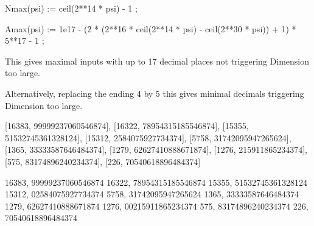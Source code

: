 


\xintdeffunc Nmax(psi) := ceil(2**14 * psi) - 1 ;

\xintdeffunc Amax(psi) := 1e17 - 
             (2 * (2**16 * ceil(2**14 * psi) - ceil(2**30 * psi)) + 1) * 5**17
                          - 1 ;


\immediate{}

\bye

This gives maximal inputs with up to 17 decimal places
not triggering Dimension too large.

Alternatively, replacing the ending 4 by 5 this gives
minimal decimals triggering Dimension too large.

[16383, 99999237060546874], [16322, 78954315185546874], [15355, 51532745361328124], [15312, 2584075927734374], [5758, 31742095947265624], [1365, 33333587646484374], [1279, 62627410888671874], [1276, 215911865234374], [575, 83174896240234374], [226, 70540618896484374]

16383, 99999237060546874
16322, 78954315185546874
15355, 51532745361328124
15312, 02584075927734374
 5758, 31742095947265624
 1365, 33333587646484374
 1279, 62627410888671874
 1276, 00215911865234374
  575, 83174896240234374
  226, 70540618896484374